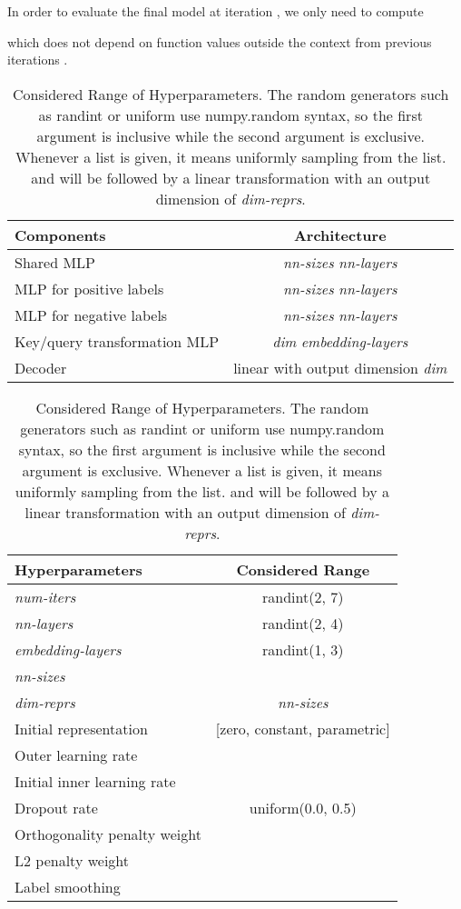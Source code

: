 \documentclass{article}
\theoremstyle{definition}
\begin{document}
In order to evaluate the final model  at iteration , we only need to compute

which does not depend on function values outside the context from previous iterations .


\newcommand{\randint}{\fontfamily{pcr}\selectfont randint}
\newcommand{\uniform}{\fontfamily{pcr}\selectfont uniform}
\newcommand{\numpy}{\fontfamily{pcr}\selectfont numpy.random}

\begin{table}[!htb] 
  \centering
  \begin{threeparttable}[]
  \caption{Considered Range of Hyperparameters. The random generators such as {\randint} or {\uniform} use {\numpy} syntax, so the first argument is inclusive while the second argument is exclusive. Whenever a list is given, it means uniformly sampling from the list.  and  will be followed by a linear transformation with an output dimension of \emph{dim-reprs}.}
  \begin{tabular}{l|c}
    \toprule
    Components &         Architecture \\ 
    \midrule
    Shared MLP  & \emph{nn-sizes}  \emph{nn-layers} \\
    MLP for positive labels  & \emph{nn-sizes}  \emph{nn-layers} \\
    MLP for negative labels  & \emph{nn-sizes}  \emph{nn-layers} \\
    Key/query transformation MLP  & \emph{dim}  \emph{embedding-layers} \\
    Decoder & linear with output dimension \emph{dim} \\
    \bottomrule
  \end{tabular}
  \begin{tabular}{l|c}
    \toprule
    Hyperparameters &         Considered Range \\ 
    \midrule
    \emph{num-iters} & \randint(2, 7)  \\
    \emph{nn-layers} & \randint(2, 4)\\
    \emph{embedding-layers} & \randint(1, 3)\\
    \emph{nn-sizes} &  \\
    \emph{dim-reprs} &  \emph{nn-sizes} \\
    Initial representation  \;\;\;\;\;\;\;\;\;\;\;\;\;\;\; & [zero, constant, parametric] \\ 
    \midrule 
    Outer learning rate &   \\ 
    Initial inner learning rate &  \\ 
    Dropout rate & \uniform(0.0, 0.5) \\ 
    Orthogonality penalty weight &  \\ 
    L2 penalty weight &  \\ 
    Label smoothing &  \\ 
    \bottomrule
  \end{tabular}
  \label{tb:hyperparameters-considered}
  \end{threeparttable}
\end{table}
\end{document}
